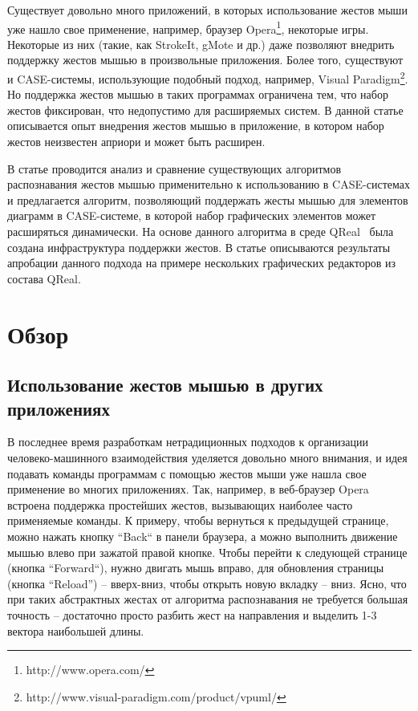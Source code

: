 \documentclass[a5paper]{article}
\begin{document}
Существует довольно много приложений, в которых использование жестов мыши уже нашло свое применение, например, браузер Opera\footnote{http://www.opera.com/}, некоторые игры. Некоторые из них (такие, как StrokeIt, gMote и др.) даже позволяют внедрить поддержку  жестов мышью в произвольные приложения. Более того, существуют и CASE-системы, использующие подобный подход, например, Visual Paradigm\footnote{http://www.visual-paradigm.com/product/vpuml/}. Но поддержка жестов мышью в таких программах ограничена тем, что набор жестов фиксирован, что недопустимо для расширяемых систем. В данной статье описывается опыт внедрения жестов мышью в приложение, в котором набор жестов неизвестен априори и может быть расширен.

В статье проводится анализ и сравнение существующих алгоритмов распознавания жестов мышью применительно к использованию в CASE-системах и предлагается алгоритм, позволяющий поддержать жесты мышью для элементов диаграмм в CASE-системе, в которой набор графических элементов может расширяться динамически. На основе данного алгоритма в среде QReal~\cite{qreal} была создана инфраструктура поддержки жестов. В статье описываются результаты апробации данного подхода на примере нескольких графических редакторов из состава QReal. 

\section{Обзор}

\subsection{Использование жестов мышью в других приложениях}

В последнее время разработкам нетрадиционных подходов к организации человеко-машинного взаимодействия уделяется довольно много внимания, и идея подавать команды программам с помощью жестов мыши уже нашла свое применение во многих приложениях. Так, например, в веб-браузер Opera встроена поддержка простейших жестов, вызывающих наиболее часто применяемые команды. К примеру, чтобы вернуться к предыдущей странице, можно нажать кнопку ``Back`` в панели браузера, а можно выполнить движение мышью влево при зажатой правой кнопке. Чтобы перейти к следующей странице (кнопка ``Forward``), нужно двигать мышь вправо, для обновления страницы (кнопка ``Reload'') -- вверх-вниз, чтобы открыть новую вкладку -- вниз. Ясно, что при таких абстрактных жестах от алгоритма распознавания не требуется большая точность -- достаточно просто разбить жест на направления и выделить 1-3 вектора наибольшей длины.
\end{document}
